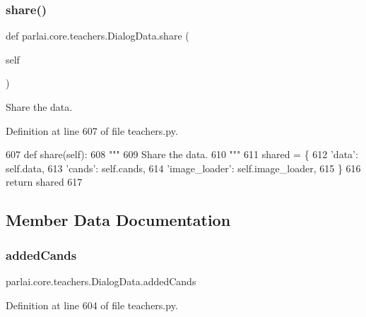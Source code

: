 \subsubsection{\texorpdfstring{share()}{share()}}
{\footnotesize\ttfamily def parlai.\+core.\+teachers.\+Dialog\+Data.\+share (\begin{DoxyParamCaption}\item[{}]{self }\end{DoxyParamCaption})}

\begin{DoxyVerb}Share the data.
\end{DoxyVerb}
 

Definition at line 607 of file teachers.\+py.


\begin{DoxyCode}
607     \textcolor{keyword}{def }share(self):
608         \textcolor{stringliteral}{"""}
609 \textcolor{stringliteral}{        Share the data.}
610 \textcolor{stringliteral}{        """}
611         shared = \{
612             \textcolor{stringliteral}{'data'}: self.data,
613             \textcolor{stringliteral}{'cands'}: self.cands,
614             \textcolor{stringliteral}{'image\_loader'}: self.image\_loader,
615         \}
616         \textcolor{keywordflow}{return} shared
617 
\end{DoxyCode}


\subsection{Member Data Documentation}
\mbox{\label{classparlai_1_1core_1_1teachers_1_1DialogData_aee61e6bc9e80fe0443a7f5322c4ae08d}} 
\subsubsection{\texorpdfstring{added\+Cands}{addedCands}}
{\footnotesize\ttfamily parlai.\+core.\+teachers.\+Dialog\+Data.\+added\+Cands}



Definition at line 604 of file teachers.\+py.

\mbox{\label{classparlai_1_1core_1_1teachers_1_1DialogData_a21822d2d86e26a27bdc8326b48ebc9b9}} 
